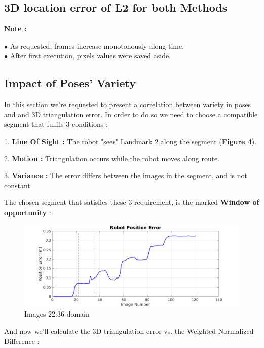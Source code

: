 \documentclass[a4paper]{article}
\begin{document}
\subsection{ 3D location error of L2 for both Methods }



\textbf{Note : }
\begin{flushleft}
$\bullet$ As requested, frames increase monotonously along time.\\
$\bullet$ After first execution, pixels values were saved aside.
\end{flushleft}

\subsection{ Impact of Poses' Variety }

\newpage

In this section we're requested to present a correlation between variety in poses and and 3D triangulation error. In order to do so we need to choose a compatible segment that fulfils 3 conditions : 

1. \textbf{Line Of Sight : } The robot "sees" Landmark 2 along the segment (\textbf{Figure 4}).

2. \textbf{Motion : } Triangulation occurs while the robot moves along route.

3. \textbf{Variance :} The error differs between the images in the segment, and is not constant.

The chosen segment that satisfies these 3 requirement, is the marked \textbf{Window of opportunity } : 

\begin{figure}[H]
\centering
\includegraphics[scale=0.48]{Rob_Pose_Err}
\caption{ Images 22:36 domain} 
\end{figure} 

And now we'll calculate the 3D triangulation error vs. the Weighted Normalized Difference :
\end{document}
